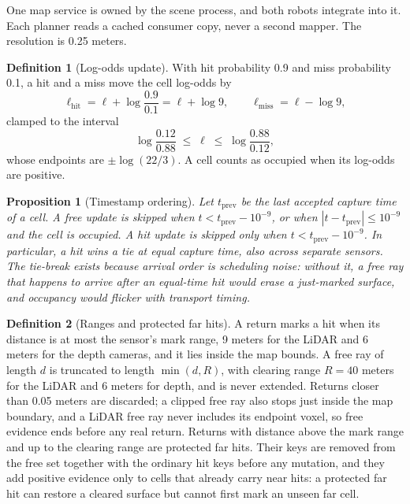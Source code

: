 \documentclass[10pt,a4paper]{article}
\theoremstyle{plain}
\newtheorem{proposition}{Proposition}[section]
\theoremstyle{definition}
\newtheorem{definition}{Definition}[section]
\theoremstyle{remark}
\begin{document}
One map service is owned by the scene process, and both robots integrate into it. Each planner reads a cached consumer copy, never a second mapper. The resolution is 0.25 meters.

\begin{definition}[Log-odds update]\label{def:logodds}
With hit probability 0.9 and miss probability 0.1, a hit and a miss move the cell log-odds by
\begin{equation}
\ell_{\mathrm{hit}} = \ell + \log\frac{0.9}{0.1} = \ell + \log 9, \qquad
\ell_{\mathrm{miss}} = \ell - \log 9,
\end{equation}
clamped to the interval
\begin{equation}
\log\frac{0.12}{0.88} \;\le\; \ell \;\le\; \log\frac{0.88}{0.12},
\end{equation}
whose endpoints are $\pm\log(22/3)$. A cell counts as occupied when its log-odds are positive.
\end{definition}

\begin{proposition}[Timestamp ordering]\label{prop:ordering}
Let $t_{\mathrm{prev}}$ be the last accepted capture time of a cell. A free update is skipped when $t < t_{\mathrm{prev}} - 10^{-9}$, or when $|t - t_{\mathrm{prev}}| \le 10^{-9}$ and the cell is occupied. A hit update is skipped only when $t < t_{\mathrm{prev}} - 10^{-9}$. In particular, a hit wins a tie at equal capture time, also across separate sensors. The tie-break exists because arrival order is scheduling noise: without it, a free ray that happens to arrive after an equal-time hit would erase a just-marked surface, and occupancy would flicker with transport timing.
\end{proposition}

\begin{definition}[Ranges and protected far hits]\label{def:ranges}
A return marks a hit when its distance is at most the sensor's mark range, 9 meters for the LiDAR and 6 meters for the depth cameras, and it lies inside the map bounds. A free ray of length $d$ is truncated to length $\min(d, R)$, with clearing range $R = 40$ meters for the LiDAR and 6 meters for depth, and is never extended. Returns closer than 0.05 meters are discarded; a clipped free ray also stops just inside the map boundary, and a LiDAR free ray never includes its endpoint voxel, so free evidence ends before any real return. Returns with distance above the mark range and up to the clearing range are protected far hits. Their keys are removed from the free set together with the ordinary hit keys before any mutation, and they add positive evidence only to cells that already carry near hits: a protected far hit can restore a cleared surface but cannot first mark an unseen far cell.
\end{definition}
\end{document}

